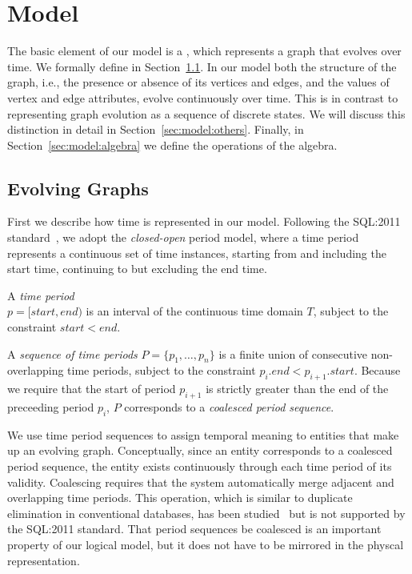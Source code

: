 \section{Model}
\label{sec:model}

The basic element of our model is a \tg, which represents a graph that
evolves over time.  We formally define \tgs in
Section~\ref{sec:model:structure}.  In our model both the structure of
the graph, i.e., the presence or absence of its vertices and edges,
and the values of vertex and edge attributes, evolve continuously over
time.  This is in contrast to representing graph evolution as a
sequence of discrete states.  We will discuss this distinction in
detail in Section~\ref{sec:model:others}.  Finally, in
Section~\ref{sec:model:algebra} we define the operations of the \tg
algebra.

\subsection{Evolving Graphs}
\label{sec:model:structure}

First we describe how time is represented in our model. Following the
SQL:2011 standard~\cite{DBLP:journals/sigmod/KulkarniM12}, we adopt
the {\em closed-open} period model, where a time period represents a
continuous set of time instances, starting from and including the
start time, continuing to but excluding the end time.

\begin{definition}
A {\em time period} \\$p = [start, end)$ is an interval of the
  continuous time domain $T$, subject to the constraint $start < end$.
\label{def:period} 
\end{definition}

\begin{definition}
A {\em sequence of time periods} $P = \{p_1, \ldots, p_n \}$ is a
finite union of consecutive non-overlapping time periods, subject to
the constraint $p_i.end < p_{i+1}.start$.  Because we require that the
start of period $p_{i+1}$ is strictly greater than the end of the
preceeding period $p_i$, $P$ corresponds to a {\em coalesced period
  sequence}.
\label{def:seq}
\end{definition}

We use time period sequences to assign temporal meaning to entities
that make up an evolving graph.  Conceptually, since an entity
corresponds to a coalesced period sequence, the entity exists
continuously through each time period of its validity.  Coalescing
requires that the system automatically merge adjacent and overlapping
time periods.  This operation, which is similar to duplicate
elimination in conventional databases, has been
studied~\cite{DBLP:conf/vldb/BohlenSS96,DBLP:journals/sigmod/Zimanyi06}
but is not supported by the SQL:2011 standard.  That period sequences
be coalesced is an important property of our logical model, but it
does not have to be mirrored in the physcal representation.


